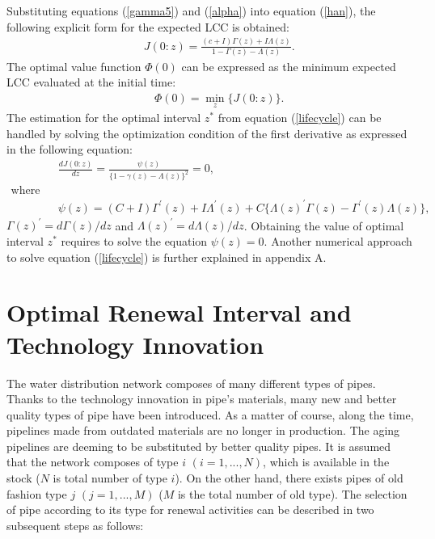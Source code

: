 Substituting equations (\ref{gamma5}) and (\ref{alpha}) into equation (\ref{han}), the following explicit form for the expected LCC is obtained:
\begin{eqnarray}
&& J(0:z)= \frac{(c+I)\Gamma(z)+I \Lambda(z)}{1-\Gamma(z)-\Lambda(z)} .\label{lifecycle}
\end{eqnarray}
The optimal value function $\Phi(0)$ can be expressed as the minimum expected LCC evaluated at the initial time:
\begin{eqnarray}
&& \Phi(0)=\min_{z}\{ J(0:z) \}.\label{imp}
\end{eqnarray}
The estimation for the optimal interval $z^*$ from equation (\ref{lifecycle}) can be handled by solving the optimization condition of the first derivative as expressed in the following equation:
\begin{eqnarray}
&& \frac{dJ(0:z)}{dz}=\frac{ \psi(z)}{\{1-\gamma(z)-\Lambda(z)\}^2 }=0, \\
\text{where}\nonumber \\
&& \psi(z)=(C+I)\Gamma^\prime(z)+I\Lambda^\prime(z)+C\{\Lambda(z)^\prime\Gamma(z)
 -\Gamma^\prime(z)\Lambda(z)\},
\end{eqnarray}
$\Gamma(z)^\prime=d\Gamma(z)/dz$ and $\Lambda(z) ^\prime=d\Lambda(z)/dz$. Obtaining the value of optimal interval $z^*$ requires to solve the equation $\psi(z)=0$. Another numerical approach to solve equation (\ref{lifecycle}) is further explained in appendix A.
\section{Optimal Renewal Interval and Technology Innovation}
\label{57}
The water distribution network composes of many different types of pipes. Thanks to the technology innovation in pipe's materials, many new and better quality types of pipe have been introduced. As a matter of course, along the time, pipelines made from outdated materials are no longer in production. The aging pipelines are deeming to be substituted by better quality pipes. It is assumed that the network composes of type $i$ $(i=1,...,N)$, which is available in the stock ($N$ is total number of type $i$). On the other hand, there exists pipes of old fashion type $j$ $(j=1,...,M)$ ($M$ is the total number of old type). The selection of pipe according to its type for renewal activities can be described in two subsequent steps as follows:
